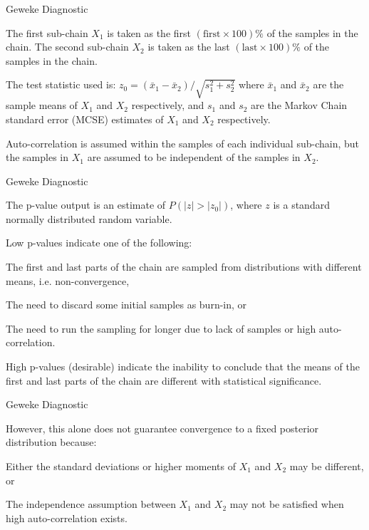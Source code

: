 \begin{frame}{Geweke Diagnostic}
    \begin{vfilleditems}
        \item The first sub-chain $X_1$ is taken as the first $(\text{first} \times 100)\%$ of the samples in the chain. The second sub-chain $X_2$ is taken as the last $(\text{last} \times 100)\%$ of the samples in the chain.
        \item The test statistic used is: $z_0 = (\bar{x}_1 - \bar{x}_2) / \sqrt{s_1^2 + s_2^2}$ where $\bar{x}_1$ and $\bar{x}_2$ are the sample means of $X_1$ and $X_2$ respectively, and $s_1$ and $s_2$ are the Markov Chain standard error (MCSE) estimates of $X_1$ and $X_2$ respectively.
        \item Auto-correlation is assumed within the samples of each individual sub-chain, but the samples in $X_1$ are assumed to be independent of the samples in $X_2$.
    \end{vfilleditems}
\end{frame}

\begin{frame}{Geweke Diagnostic}
    \begin{vfilleditems}
        \item The p-value output is an estimate of $P(|z| > |z_0|)$, where $z$ is a standard normally distributed random variable.
        \item Low p-values indicate one of the following:
            \begin{vfilleditems}
                \item The first and last parts of the chain are sampled from distributions with different means, i.e. non-convergence,
                \item The need to discard some initial samples as burn-in, or
                \item The need to run the sampling for longer due to lack of samples or high auto-correlation.
            \end{vfilleditems}
        \item High p-values (desirable) indicate the inability to conclude that the means of the first and last parts of the chain are different with statistical significance.
    \end{vfilleditems}
\end{frame}

\begin{frame}{Geweke Diagnostic}
    \begin{vfilleditems}
        \item However, this alone does not guarantee convergence to a fixed posterior distribution because:
            \begin{vfilleditems}
                \item Either the standard deviations or higher moments of $X_1$ and $X_2$ may be different, or
                \item The independence assumption between $X_1$ and $X_2$ may not be satisfied when high auto-correlation exists.
            \end{vfilleditems}
    \end{vfilleditems}
\end{frame}

